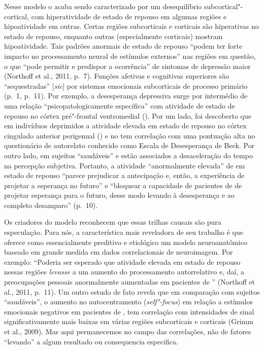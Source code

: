 Nesse modelo o  acaba sendo caracterizado por um desequilíbrio
subcortical"-cortical, com hiperatividade de estado de repouso em algumas
regiões e hipoatividade em outras. Certas regiões subcorticais e
corticais são hiperativas no estado de repouso, enquanto outras
(especialmente corticais) mostram hipoatividade. Tais padrões anormais
de estado de repouso ``podem ter forte impacto no processamento neural
de estímulos externos'' nas regiões em questão, o que ``pode permitir e
predispor a ocorrência'' de sintomas de depressão maior (Northoff et
al., 2011, p.~7). Funções afetivas e cognitivas superiores são
``sequestradas'' {[}\emph{sic}{]} por sistemas emocionais subcorticais
de processo primário (p.~1, p.~11). Por exemplo, a desesperança depressiva
surge por intermédio de uma relação ``psicopatologicamente específica''
com atividade de estado de repouso no córtex pré"-frontal ventromedial
(). Por um lado, foi descoberto que em indivíduos deprimidos a
atividade elevada em estado de repouso no córtex cingulado anterior
perigenual () e no  tem correlação com uma pontuação alta no
questionário de autorelato conhecido como Escala de Desesperança de
Beck. Por outro lado, em sujeitos ``saudáveis''  e  estão
associados a desaceleração do tempo na percepção subjetiva. Portanto, a
atividade ``anormalmente elevada'' de  em estado de repouso
``parece prejudicar a antecipação e, então, a experiência de projetar a
esperança no futuro'' e ``bloquear a capacidade de pacientes de  de
projetar esperança para o futuro, desse modo levando à desesperança e ao
completo desamparo'' (p.~10).

Os criadores do modelo reconhecem que essas trilhas causais são pura
especulação. Para nós, a característica mais reveladora de seu trabalho
é que oferece como essencialmente preditivo e etiológico um modelo
neuroanatômico baseado em grande medida em dados correlacionais de
neuroimagem. Por exemplo: ``Poderia ser esperado que atividade elevada
em estado de repouso nessas regiões \emph{levasse} a um aumento do
processamento autorrelativo e, daí, a preocupações pessoais anormalmente
aumentadas em pacientes de '' (Northoff et al., 2011, p.~11). Um outro
estudo de fato revela que em comparação com sujeitos ``saudáveis'', o
aumento no autocentramento (\emph{self"-focus}) em relação a estímulos
emocionais negativos em pacientes de , tem correlação com
intensidades de sinal significativamente mais baixas em várias regiões
subcorticais e corticais (Grimm et al., 2009). Mas aqui permanecemos no
campo das correlações, não de fatores ``levando'' a algum resultado ou
consequencia especifica.

